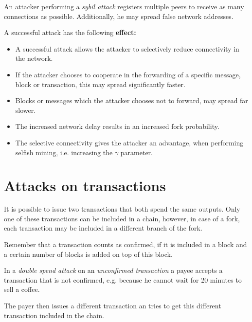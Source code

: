 \begin{definition}
	An attacker performing a \emph{sybil attack} registers multiple peers to receive as many connections as possible. Additionally, he may spread false network addresses. 
\end{definition}

\begin{note}
A successful attack has the following \textbf{effect:}
\begin{itemize}
	\item A successful attack allows the attacker to selectively reduce connectivity in the network. 
	\item If the attacker chooses to cooperate in the forwarding of a specific message, block or transaction, this may spread significantly faster. 
	\item Blocks or messages which the attacker chooses not to forward, may spread far slower.
	\item The increased network delay results in an increased fork probability.
	\item The selective connectivity gives the attacker an advantage, when performing selfish mining, i.e. increasing the $\gamma$ parameter.
\end{itemize}
\end{note}


\section{Attacks on transactions}
It is possible to issue two transactions that both spend the same outputs.
Only one of these transactions can be included in a chain, however, in case of a fork, each transaction may be included in a different branch of the fork.

Remember that a transaction counts as confirmed, if it is included in a block and a certain number of blocks is added on top of this block.

\begin{definition}
In a \emph{double spend attack} on an \emph{unconfirmed transaction} a payee accepts a transaction that is not confirmed, e.g. because he cannot wait for 20 minutes to sell a coffee. 

The payer then issues a different transaction an tries to get this different transaction included in the chain.
\end{definition}

